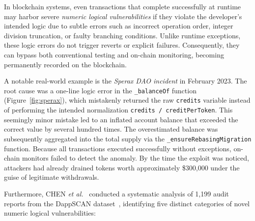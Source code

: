 \documentclass[10pt, conference]{IEEEtran}
\begin{document}
In blockchain systems, even transactions that complete successfully at runtime may harbor severe \textit{numeric logical vulnerabilities} if they violate the developer’s intended logic due to subtle errors such as incorrect operation order, integer division truncation, or faulty branching conditions. Unlike runtime exceptions, these logic errors do not trigger reverts or explicit failures. Consequently, they can bypass both conventional testing and on-chain monitoring, becoming permanently recorded on the blockchain.

A notable real-world example is the \textit{Sperax DAO incident} in February 2023. The root cause was a one-line logic error in the \texttt{\_balanceOf} function (Figure~\ref{fig:sperax}), which mistakenly returned the raw \texttt{credits} variable instead of performing the intended normalization \texttt{credits / creditPerToken}. This seemingly minor mistake led to an inflated account balance that exceeded the correct value by several hundred times. The overestimated balance was subsequently aggregated into the total supply via the \texttt{\_ensureRebasingMigration} function. Because all transactions executed successfully without exceptions, on-chain monitors failed to detect the anomaly. By the time the exploit was noticed, attackers had already drained tokens worth approximately \$300,000 under the guise of legitimate withdrawals.

Furthermore, CHEN \textit{et al.}~\cite{numscout} conducted a systematic analysis of 1,199 audit reports from the DappSCAN dataset~\cite{dappscan}, identifying five distinct categories of novel numeric logical vulnerabilities:
\end{document}
